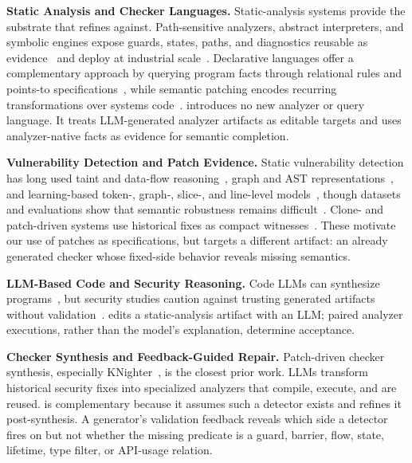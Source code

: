 \noindent\textbf{Static Analysis and Checker Languages.}\quad
Static-analysis systems provide the substrate that \toolname refines against. Path-sensitive analyzers, abstract interpreters, and symbolic engines expose guards, states, paths, and diagnostics reusable as evidence~\cite{engler2001bugs,ball2002slam,cousot2005astree,cadar2008klee} and deploy at industrial scale~\cite{calcagno2015infer,bessey2010coverity,sadowski2015tricorder}.  Declarative languages offer a complementary approach by querying program facts through relational rules and points-to specifications~\cite{avgustinov2016ql,jordan2016souffle,bravenboer2009doop}, while semantic patching encodes recurring transformations over systems code~\cite{padioleau2008coccinelle}.  \toolname introduces no new analyzer or query language. It treats LLM-generated analyzer artifacts as editable targets and uses analyzer-native facts as evidence for semantic completion.

\noindent\textbf{Vulnerability Detection and Patch Evidence.}\quad
Static vulnerability detection has long used taint and data-flow reasoning~\cite{livshits2005finding,jovanovic2006pixy,arzt2014flowdroid}, graph and AST representations~\cite{yamaguchi2014cpg,yamaguchi2012vex}, and learning-based token-, graph-, slice-, and line-level models~\cite{russell2018vulnerability,li2018vuldeepecker,li2021sysevr,fu2022linevul}, though datasets and evaluations show that semantic robustness remains difficult~\cite{fan2020bigvul,chakraborty2021deep}.  Clone- and patch-driven systems use historical fixes as compact witnesses~\cite{jang2012redebug,li2016vulpecker,kim2017vuddy}.  These motivate our use of patches as specifications, but \toolname targets a different artifact: an already generated checker whose fixed-side behavior reveals missing semantics.

\noindent\textbf{LLM-Based Code and Security Reasoning.}\quad
Code LLMs can synthesize programs~\cite{chen2021codex}, but security studies caution against trusting generated artifacts without validation~\cite{pearce2022copilot,perry2023users}. \toolname edits a static-analysis artifact with an LLM; paired analyzer executions, rather than the model's explanation, determine acceptance.

\noindent\textbf{Checker Synthesis and Feedback-Guided Repair.}\quad
Patch-driven checker synthesis, especially KNighter~\cite{yang2025knighter}, is the closest prior work. LLMs transform historical security fixes into specialized analyzers that compile, execute, and are reused.  \toolname is complementary because it assumes such a detector exists and refines it post-synthesis. A generator's validation feedback reveals which side a detector fires on but not whether the missing predicate is a guard, barrier, flow, state, lifetime, type filter, or API-usage relation.

